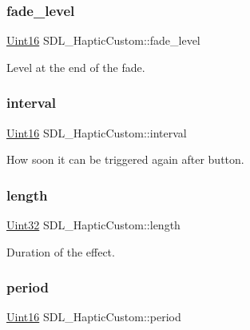 \subsubsection{\texorpdfstring{fade\+\_\+level}{fade\_level}}
{\footnotesize\ttfamily \mbox{\hyperlink{_s_d_l__stdinc_8h_a31fcc0a076c9068668173ee26d33e42b}{Uint16}} S\+D\+L\+\_\+\+Haptic\+Custom\+::fade\+\_\+level}

Level at the end of the fade. \mbox{\label{struct_s_d_l___haptic_custom_afdeb26b1709254545e00a59a0a6c360c}} 
\subsubsection{\texorpdfstring{interval}{interval}}
{\footnotesize\ttfamily \mbox{\hyperlink{_s_d_l__stdinc_8h_a31fcc0a076c9068668173ee26d33e42b}{Uint16}} S\+D\+L\+\_\+\+Haptic\+Custom\+::interval}

How soon it can be triggered again after button. \mbox{\label{struct_s_d_l___haptic_custom_ad70e8bc2cff74b99d704a757c16b363f}} 
\subsubsection{\texorpdfstring{length}{length}}
{\footnotesize\ttfamily \mbox{\hyperlink{_s_d_l__stdinc_8h_add440eff171ea5f55cb00c4a9ab8672d}{Uint32}} S\+D\+L\+\_\+\+Haptic\+Custom\+::length}

Duration of the effect. \mbox{\label{struct_s_d_l___haptic_custom_aba7fafa808e90baddef25f009b8f4817}} 
\subsubsection{\texorpdfstring{period}{period}}
{\footnotesize\ttfamily \mbox{\hyperlink{_s_d_l__stdinc_8h_a31fcc0a076c9068668173ee26d33e42b}{Uint16}} S\+D\+L\+\_\+\+Haptic\+Custom\+::period}

